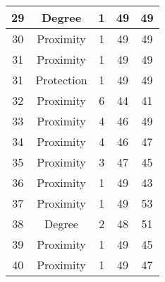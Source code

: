 \documentclass[results.tex]{subfiles}
\begin{document}
\begin{center}
\begin{tabular}{| c || c | c | c | c |}
            \hline
            29                      & Degree                       & 1                      & 49                      & 49                   \\
            \hline
            30                      & Proximity                    & 1                      & 49                      & 49                   \\
            \hline
            31                      & Proximity                    & 1                      & 49                      & 49                   \\
            \hline
            31                      & Protection                   & 1                      & 49                      & 49                   \\
            \hline
            32                      & Proximity                    & 6                      & 44                      & 41                   \\
            \hline
            33                      & Proximity                    & 4                      & 46                      & 49                   \\
            \hline
            34                      & Proximity                    & 4                      & 46                      & 47                   \\
            \hline
            35                      & Proximity                    & 3                      & 47                      & 45                   \\
            \hline
            36                      & Proximity                    & 1                      & 49                      & 43                   \\
            \hline
            37                      & Proximity                    & 1                      & 49                      & 53                   \\
            \hline
            38                      & Degree                       & 2                      & 48                      & 51                   \\
            \hline
            39                      & Proximity                    & 1                      & 49                      & 45                   \\
            \hline
            40                      & Proximity                    & 1                      & 49                      & 47                   \\

\end{tabular}
\end{center}
\end{document}
